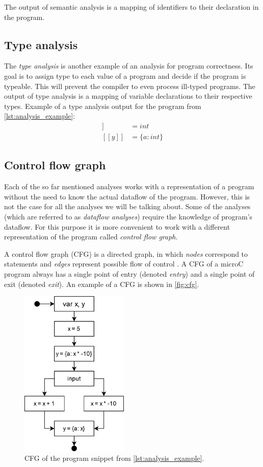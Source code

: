 \documentclass[thesis=M,english]{FITthesis}[2019/12/23]
\begin{document}
The output of semantic analysis is a mapping of identifiers to their declaration in the program.

\subsection{Type analysis}
The \emph{type analysis} is another example of an analysis for program correctness. Its goal is to assign type to each value of a program and decide if the program is typeable. This will prevent the compiler to even process ill-typed programs. The output of type analysis is a mapping of variable declarations to their respective types. Example of a type analysis output for the program from \autoref{lst:analysis_example}:
\begin{align*}
    [\![ x ]\!] &= int \\
    [\![ y ]\!] &= \{ a : int \}
\end{align*}

\subsection{Control flow graph}\label{ssec:cfg}
Each of the so far mentioned analyses works with a representation of a program without the need to know the actual dataflow of the program. However, this is not the case for all the analyses we will be talking about. Some of the analyses (which are referred to as \emph{dataflow analyses}) require the knowledge of program's dataflow. For this purpose it is more convenient to work with a different representation of the program called \emph{control flow graph}.

A control flow graph (CFG) is a directed graph, in which \emph{nodes} correspond to statements and \emph{edges} represent possible flow of control \cite[Chap. 2.5]{spa}. A CFG of a microC program always has a single point of entry (denoted \emph{entry}) and a single point of exit (denoted \emph{exit}). An example of a CFG is shown in \autoref{fig:cfg}.

\begin{figure}
    \centering
    \includegraphics[height=8cm]{img/cfg}
    \caption{CFG of the program snippet from \autoref{lst:analysis_example}.}\label{fig:cfg}
\end{figure}
\end{document}
